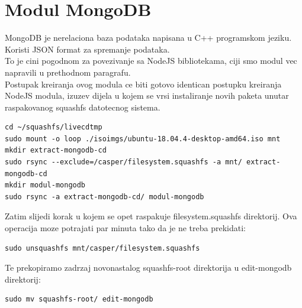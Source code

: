 \documentclass[12pt,vi]{mitthesis}
\begin{document}
\chapter*{Modul MongoDB}
MongoDB je nerelaciona baza podataka napisana u C++ programskom jeziku. Koristi JSON format za spremanje podataka.\\
To je cini pogodnom za povezivanje sa NodeJS bibliotekama, ciji smo modul vec napravili u prethodnom paragrafu.\\
Postupak kreiranja ovog modula ce biti gotovo identican postupku kreiranja NodeJS modula, izuzev dijela u kojem se vrsi instaliranje novih paketa unutar raspakovanog squashfs datotecnog sistema.\\
\begin{lstlisting}[style=BashInputStyle]
cd ~/squashfs/livecdtmp
sudo mount -o loop ./isoimgs/ubuntu-18.04.4-desktop-amd64.iso mnt
mkdir extract-mongodb-cd
sudo rsync --exclude=/casper/filesystem.squashfs -a mnt/ extract-mongodb-cd
mkdir modul-mongodb
sudo rsync -a extract-mongodb-cd/ modul-mongodb
\end{lstlisting}
Zatim slijedi korak u kojem se opet raspakuje filesystem.squashfs direktorij. Ova operacija moze potrajati par minuta tako da je ne treba prekidati:\\
\begin{lstlisting}[style=BashInputStyle]
sudo unsquashfs mnt/casper/filesystem.squashfs
\end{lstlisting}

Te prekopiramo zadrzaj novonastalog squashfs-root direktorija u edit-mongodb direktorij:
\begin{lstlisting}[style=BashInputStyle]
sudo mv squashfs-root/ edit-mongodb
\end{lstlisting}
\end{document}
